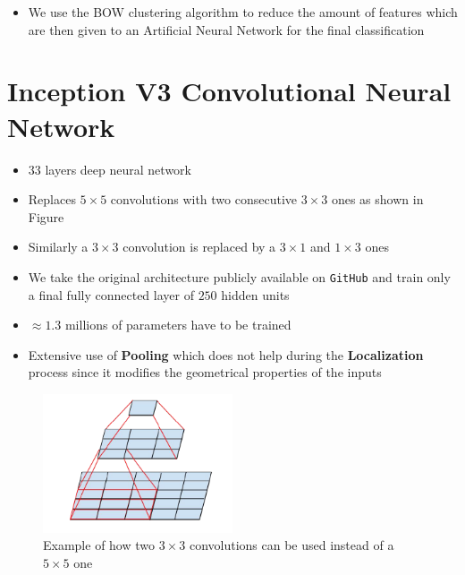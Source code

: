 \documentclass[a0, portrait]{IWIposter}
\begin{document}
\begin{multicols}{3}
\begin{itemize}
	\item We use the BOW clustering algorithm to reduce the amount of features which are then given to an Artificial Neural Network for the final classification 

\end{itemize}


\section*{Inception V3 Convolutional Neural Network}

\begin{itemize}

\item $33$ layers deep neural network
\item Replaces $5 \times 5$ convolutions with two consecutive $3 \times 3$ ones as shown in Figure
\item Similarly a $3 \times 3$ convolution is replaced by a $3 \times 1$ and $1 \times 3$ ones
\item We take the original architecture publicly available on \verb#GitHub# and train only a final fully connected layer of $250$ hidden units
\item $\approx 1.3$ millions of parameters have to be trained
\item Extensive use of \textbf{Pooling} which does not help during the \textbf{Localization} process since it modifies the geometrical properties of the inputs

\end{itemize}

\begin{figure}[H]
	\centering
	\includegraphics[width=0.5\textwidth]{ConvolutionsExample.png}
	\caption{Example of how two $3 \times 3$ convolutions can be used instead of a $5 \times 5$ one}
	\label{fig:ConvolutionsExample}
\end{figure}



\end{multicols}
\end{document}
